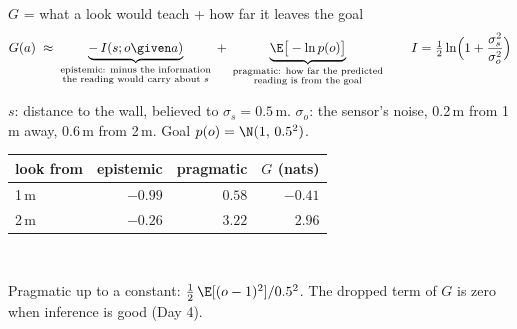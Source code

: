\begin{frame}{$G$ = what a look would teach + how far it leaves the goal}
  \label{d2f:efe2}
  \centering
  \[
    G(a) \;\approx\; \underbrace{-\,I(s;o\given a)}_{\substack{\text{epistemic: minus the information}\\ \text{the reading would carry about } s}}
    \;+\; \underbrace{\E\big[-\ln p(o)\big]}_{\substack{\text{pragmatic: how far the predicted}\\ \text{reading is from the goal}}}
    \qquad
    I = \tfrac12\ln\!\Big(1+\frac{\sigma_s^2}{\sigma_o^2}\Big)
  \]
  {\footnotesize $s$: distance to the wall, believed to $\sigma_s = 0.5$\,m.\; $\sigma_o$: the sensor's noise, 0.2\,m from 1\,m away,
  0.6\,m from 2\,m.\; Goal $p(o) = \N(1,\,0.5^2)$.\par}\vspace{0.6em}
  \renewcommand{\arraystretch}{1.3}
  \begin{tabular}{@{}l r r r@{}}
    \toprule
    look from & epistemic & pragmatic & $G$ (nats) \\
    \midrule
    1\,m & $-0.99$ & $0.58$ & \textcolor{good!70!black}{$\mathbf{-0.41}$} \\
    2\,m & $-0.26$ & $3.22$ & $2.96$ \\
    \bottomrule
  \end{tabular}\\[0.4em]
  {\footnotesize Pragmatic up to a constant: $\tfrac12\,\E[(o-1)^2]/0.5^2$. The dropped term of $G$ is zero when inference is good (Day 4).\par}
  \vfill
\end{frame}



